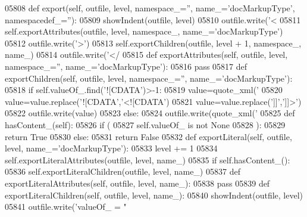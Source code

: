 \begin{DoxyCode}
{{{{{{{{{{{{{{{{{{{{{{{{{{{{{{{{{{{{{{{{{{{{{{{{{{{{{{{{{{{{{{{{{{{{{{{{{{{{{{{{{{{{{{{{{{{{{{{{{{{{{{{{{{{{{{{{{{{{{{{{{{{{{{{{{{{{{{{{{{{{{{{{{{{{{{{{{{{{{{{{{{{{{{{{{{{{{{{{{{{{{{{{{{{{{{{{{{{{{{{{{{{{{{{{{{{{{{{{{{{{{{{{{{{{{{{{{{{{{{{{{{{{{{{{{{{{{{{{{{{{{{{{{{{{{{{{{{{{{{{{{{{{{{{{{{{{{{{{{{{{{{{{{{{{{{{{{{{{{{{{{{{{{{{{{{{{{{{{{{{{{{{{{{{{{{{{{{{{05808     \textcolor{keyword}{def }export(self, outfile, level, namespace\_='', name\_='docMarkupType', namespacedef\_=''):
05809         showIndent(outfile, level)
05810         outfile.write(\textcolor{stringliteral}{'<%
05811         self.exportAttributes(outfile, level, namespace\_, name\_=\textcolor{stringliteral}{'docMarkupType'})
05812         outfile.write(\textcolor{stringliteral}{'>'})
05813         self.exportChildren(outfile, level + 1, namespace\_, name\_)
05814         outfile.write(\textcolor{stringliteral}{'</%
05815     \textcolor{keyword}{def }exportAttributes(self, outfile, level, namespace\_='', name\_='docMarkupType'):
05816         \textcolor{keywordflow}{pass}
05817     \textcolor{keyword}{def }exportChildren(self, outfile, level, namespace\_='', name\_='docMarkupType'):
05818         \textcolor{keywordflow}{if} self.valueOf\_.find(\textcolor{stringliteral}{'![CDATA'})>-1:
05819             value=quote_xml(\textcolor{stringliteral}{'%
05820             value=value.replace(\textcolor{stringliteral}{'![CDATA'},\textcolor{stringliteral}{'<![CDATA'})
05821             value=value.replace(\textcolor{stringliteral}{']]'},\textcolor{stringliteral}{']]>'})
05822             outfile.write(value)
05823         \textcolor{keywordflow}{else}:
05824             outfile.write(quote_xml(\textcolor{stringliteral}{'%
05825     \textcolor{keyword}{def }hasContent_(self):
05826         \textcolor{keywordflow}{if} (
05827             self.valueOf_ \textcolor{keywordflow}{is} \textcolor{keywordflow}{not} \textcolor{keywordtype}{None}
05828             ):
05829             \textcolor{keywordflow}{return} \textcolor{keyword}{True}
05830         \textcolor{keywordflow}{else}:
05831             \textcolor{keywordflow}{return} \textcolor{keyword}{False}
05832     \textcolor{keyword}{def }exportLiteral(self, outfile, level, name\_='docMarkupType'):
05833         level += 1
05834         self.exportLiteralAttributes(outfile, level, name\_)
05835         \textcolor{keywordflow}{if} self.hasContent_():
05836             self.exportLiteralChildren(outfile, level, name\_)
05837     \textcolor{keyword}{def }exportLiteralAttributes(self, outfile, level, name\_):
05838         \textcolor{keywordflow}{pass}
05839     \textcolor{keyword}{def }exportLiteralChildren(self, outfile, level, name\_):
05840         showIndent(outfile, level)
05841         outfile.write(\textcolor{stringliteral}{'valueOf\_ = "%
}}}}}}}}}}}}}}}}}}}}}}}}}}}}}}}}}}}}}}}}}}}}}}}}}}}}}}}}}}}}}}}}}}}}}}}}}}}}}}}}}}}}}}}}}}}}}}}}}}}}}}}}}}}}}}}}}}}}}}}}}}}}}}}}}}}}}}}}}}}}}}}}}}}}}}}}}}}}}}}}}}}}}}}}}}}}}}}}}}}}}}}}}}}}}}}}}}}}}}}}}}}}}}}}}}}}}}}}}}}}}}}}}}}}}}}}}}}}}}}}}}}}}}}}}}}}}}}}}}}}}}}}}}}}}}}}}}}}}}}}}}}}}}}}}}}}}}}}}}}}}}}}}}}}}}}}}}}}}}}}}}}}}}}}}}}}}}}}}}}}}}}}}}}}}}}}}}}}}}}}}
\end{DoxyCode}
